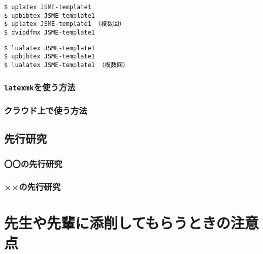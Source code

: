 \documentclass[
    paper=a4paper,      %
    report,             %
    fleqn,              %
    fontsize=12pt,      %
    jafontsize=12pt,    %
    head_space=33mm,    %
    foot_space=30mm,    %
    gutter=25mm,        %
    fore-edge=10mm      %
    ]{jlreq}            %
\begin{document}
\begin{tcolorbox}[enhanced, title=\upLaTeX$+$\upBibTeX, drop fuzzy shadow]
\begin{verbatim}
$ uplatex JSME-template1
$ upbibtex JSME-template1
$ uplatex JSME-template1 （複数回）
$ dvipdfmx JSME-template1
\end{verbatim}
\end{tcolorbox}

\begin{tcolorbox}[enhanced, title=\LuaLaTeX$+$\upBibTeX, drop fuzzy shadow]
\begin{verbatim}
$ lualatex JSME-template1
$ upbibtex JSME-template1
$ lualatex JSME-template1 （複数回）
\end{verbatim}
\end{tcolorbox}


\subsection{\texttt{latexmk}を使う方法}
\label{ssec:latexmk}

\lipsum[1-8]

\subsection{クラウド上で使う方法}
\label{ssec:cloud}


\section{先行研究}
\label{sec:previous}

\lipsum[1-2]

\subsection{〇〇の先行研究}
\label{ssec:marumaru}


\subsection{××の先行研究}
\label{ssec:batsubatsu}

\lipsum[1-4]

\chapter{先生や先輩に添削してもらうときの注意点}
\label{ch:check}
\end{document}
